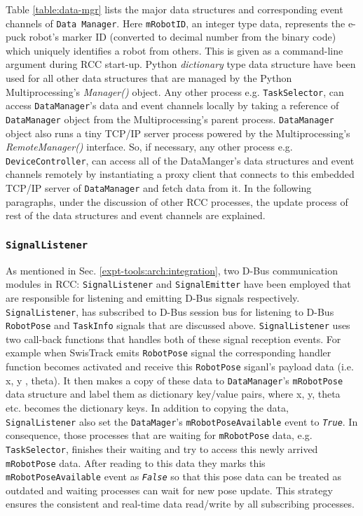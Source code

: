 Table \ref{table:data-mgr} lists the major data structures and corresponding event channels of \texttt{Data Manager}. Here \texttt{mRobotID}, an integer type data,  represents the e-puck robot's marker ID (converted to decimal number from the binary code) which uniquely identifies a robot from others. This is given as a command-line argument during RCC start-up. Python {\em dictionary} type data structure  have been used  for all other data structures that are managed by the Python Multiprocessing's {\em Manager()} object. Any other process e.g. \texttt{TaskSelector}, can access \texttt{DataManager}'s data and event channels locally  by taking a reference of \texttt{DataManager} object from the Multiprocessing's parent process. \texttt{DataManager} object also runs a tiny TCP/IP server process powered by the Multiprocessing's {\em RemoteManager()} interface. So, if necessary,  any other process e.g. \texttt{DeviceController}, can access all of the DataManger's data structures and event channels remotely by instantiating a proxy client  that connects to this embedded TCP/IP server of \texttt{DataManager} and  fetch data from it. In the following paragraphs, under the discussion of other RCC processes, the update process of rest of the data structures and event channels are explained.
\subsubsection*{\texttt{SignalListener}}
As mentioned in Sec. \ref{expt-tools:arch:integration}, two D-Bus communication modules in RCC: \texttt{SignalListener} and \texttt{SignalEmitter} have been employed that are responsible for listening and emitting D-Bus signals respectively. \texttt{SignalListener}, has subscribed to D-Bus session bus for listening  to D-Bus \texttt{RobotPose} and \texttt{TaskInfo} signals that are discussed above. \texttt{SignalListener} uses two call-back functions that handles both of these signal reception events. For example when SwisTrack emits \texttt{RobotPose} signal  the corresponding handler function becomes activated and receive this \texttt{RobotPose} siganl's payload data (i.e. x, y , theta). It then makes a copy of these data  to \texttt{DataManager}'s \texttt{mRobotPose} data structure and label them as dictionary key/value pairs, where x, y, theta etc. becomes the dictionary keys. In addition to copying the data, \texttt{SignalListener} also set the \texttt{DataMager}'s   \texttt{mRobotPoseAvailable} event to {\em \texttt{True}}. In consequence, those processes that are waiting for \texttt{mRobotPose} data, e.g. \texttt{TaskSelector}, finishes their waiting and try to access this newly arrived \texttt{mRobotPose} data. After reading to this data they marks this \texttt{mRobotPoseAvailable} event as  {\em \texttt{False}} so that this pose data can be treated as outdated and waiting processes can wait for new pose update. This strategy ensures the consistent and real-time data read/write by all subscribing processes.
